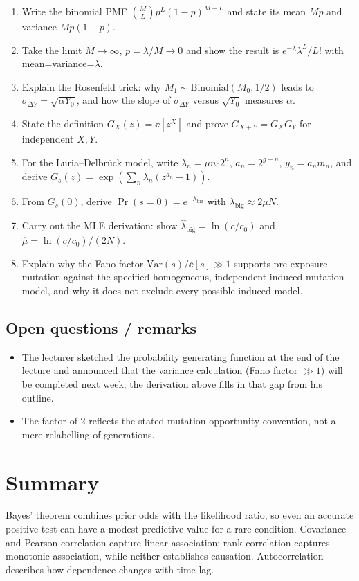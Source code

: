 \begin{enumerate}[nosep]
\item Write the binomial PMF $\binom{M}{L}p^{L}(1-p)^{M-L}$ and state its mean $Mp$ and variance $Mp(1-p)$.
\item Take the limit $M\to\infty$, $p=\lambda/M\to0$ and show the result is $e^{-\lambda}\lambda^{L}/L!$ with mean=variance=$\lambda$.
\item Explain the Rosenfeld trick: why $M_1\sim\mathrm{Binomial}(M_0,1/2)$ leads to $\sigma_{\Delta Y}=\sqrt{\alpha Y_0}$, and how the slope of $\sigma_{\Delta Y}$ versus $\sqrt{Y_0}$ measures $\alpha$.
\item State the definition $G_X(z)=\ee[z^X]$ and prove $G_{X+Y}=G_XG_Y$ for independent $X,Y$.
\item For the Luria--Delbr{\"u}ck model, write $\lambda_n=\mu n_0 2^n$, $a_n=2^{g-n}$, $y_n=a_nm_n$, and derive $G_s(z)=\exp(\sum_n\lambda_n(z^{a_n}-1))$.
\item From $G_s(0)$, derive $\Pr(s=0)=e^{-\lambda_{\mathrm{big}}}$ with $\lambda_{\mathrm{big}}\approx2\mu N$.
\item Carry out the MLE derivation: show $\hat{\lambda}_{\mathrm{big}}=\ln(c/c_0)$ and $\hat{\mu}=\ln(c/c_0)/(2N)$.
\item Explain why the Fano factor $\mathrm{Var}(s)/\ee[s]\gg1$ supports pre-exposure mutation against the specified homogeneous, independent induced-mutation model, and why it does not exclude every possible induced model.
\end{enumerate}

\subsection*{Open questions / remarks}
\begin{itemize}[nosep]
\item The lecturer sketched the probability generating function at the end of the lecture and announced that the variance calculation (Fano factor $\gg1$) will be completed next week; the derivation above fills in that gap from his outline.
\item The factor of 2 reflects the stated mutation-opportunity convention, not a mere relabelling of generations.
\end{itemize}

\section*{Summary}
Bayes' theorem combines prior odds with the likelihood ratio, so even an accurate positive test can have a modest predictive value for a rare condition. Covariance and Pearson correlation capture linear association; rank correlation captures monotonic association, while neither establishes causation. Autocorrelation describes how dependence changes with time lag.

